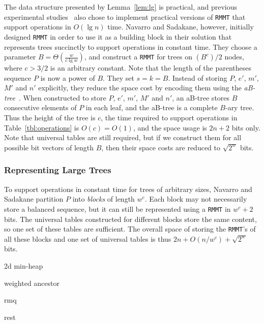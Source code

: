 The data structure presented by Lemma~\ref{lem:lg} is practical, and previous experimental studies~\cite{ACNSalenex10} also chose to implement practical versions of {\tt RMMT} that support operations in $O(\lg n)$ time. 
Navarro and Sadakane, however, initially designed {\tt RMMT} in order to use it as a building block in their solution that represents trees succinctly to support operations in constant time. 
They choose a parameter $B = \Theta(\frac{w}{c\lg w})$, and construct a {\tt RMMT} for trees on $(B^c)/2$ nodes, where $c > 3/2$ is an arbitrary constant. 
Note that the length of the parentheses sequence $P$ is now a power of $B$. 
They set $s = k = B$. 
Instead of storing $P$, $e'$, $m'$, $M'$ and $n'$ explicitly, they reduce the space cost by encoding them using the {\em aB-tree}~\cite{Patrascu:2008:SUC:1470582.1470670}. 
When constructed to store $P$, $e'$, $m'$, $M'$ and $n'$, an aB-tree stores $B$ consecutive elements of $P$ in each leaf, and the aB-tree is a complete $B$-ary tree. 
Thus the height of the tree is $c$, the time required to support operations in Table~\ref{tbl:operations} is $O(c) = O(1)$, and the space usage is $2n+2$ bits only. 
Note that universal tables are still required, but if we construct them for all possible bit vectors of length $B$, then their space costs are reduced to $\sqrt{2^w}$ bits. 

\subsubsection{Representing Large Trees}

To support operations in constant time for trees of arbitrary sizes, Navarro and Sadakane partition $P$ into {\em blocks} of length $w^c$. 
Each block may not necessarily store a balanced sequence, but it can still be represented using a {\tt RMMT} in $w^c + 2$ bits.  
The universal tables constructed for different blocks store the same content, so one set of these tables are sufficient. 
The overall space of storing the {\tt RMMT}'s of all these blocks and one set of universal tables is thus $2n + O(n/w^c) + \sqrt{2^w}$ bits. 

2d min-heap

weighted ancestor

rmq

rest